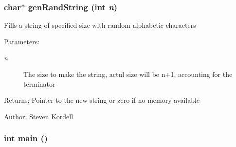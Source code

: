 \subsubsection{\setlength{\rightskip}{0pt plus 5cm}char$\ast$ gen\-Rand\-String (int {\em n})}\label{randomtreetest_8c_6d35dbb5801b4a0118ee8fca9413285a}


Fills a string of specified size with random alphabetic characters \begin{Desc}
\item[Parameters:]
\begin{description}
\item[{\em n}]The size to make the string, actul size will be n+1, accounting for the terminator \end{description}
\end{Desc}
\begin{Desc}
\item[Returns:]Pointer to the new string or zero if no memory available \end{Desc}
\begin{Desc}
\item[Author:]Steven Kordell \end{Desc}
\subsubsection{\setlength{\rightskip}{0pt plus 5cm}int main ()}\label{randomtreetest_8c_446c6b9a1a4dbab517fbb760870458a3}


